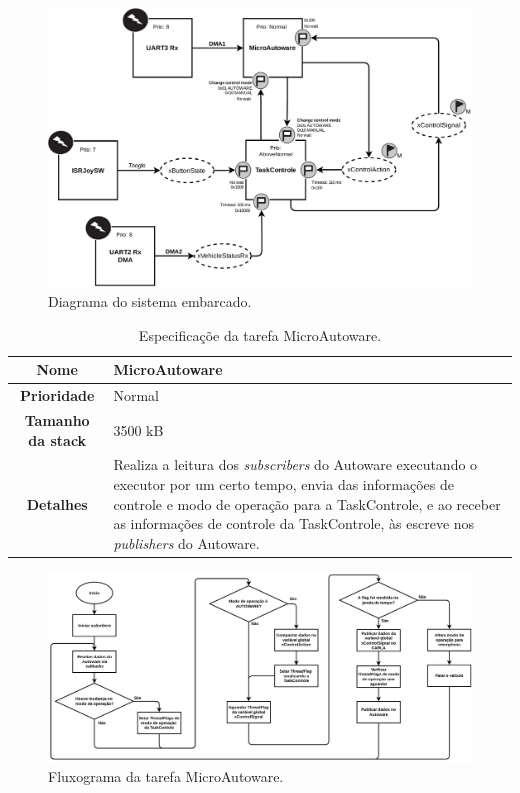 \begin{figure}[H]
	\centering
	\includegraphics[width = \textwidth]{img/system_diagram}
	\caption{Diagrama do sistema embarcado.}
	\label{fig:systemdiagram}
\end{figure}

\begin{table}[H]
	\centering
	\begin{tabular}{c|p{11.5cm}}
		\textbf{Nome} & MicroAutoware \\
		\hline
		\textbf{Prioridade}& Normal \\
		\hline
		\textbf{Tamanho da stack} & 3500 kB \\
		\hline
		\textbf{Detalhes} & Realiza a leitura dos \textit{subscribers} do Autoware executando o executor por um certo tempo, envia das informações de controle e modo de operação para a TaskControle, e ao receber as informações de controle da TaskControle, às escreve nos \textit{publishers} do Autoware.\\
	\end{tabular}
	\caption{Especificaçõe da tarefa MicroAutoware.}
	\label{tab:microautoware}
\end{table}

\begin{figure}[H]
	\centering
	\includegraphics[width = \textwidth]{img/fluxograma_microautoware}
	\caption{Fluxograma da tarefa MicroAutoware.}
	\label{fig:fluxograma_microautoware}
\end{figure}

